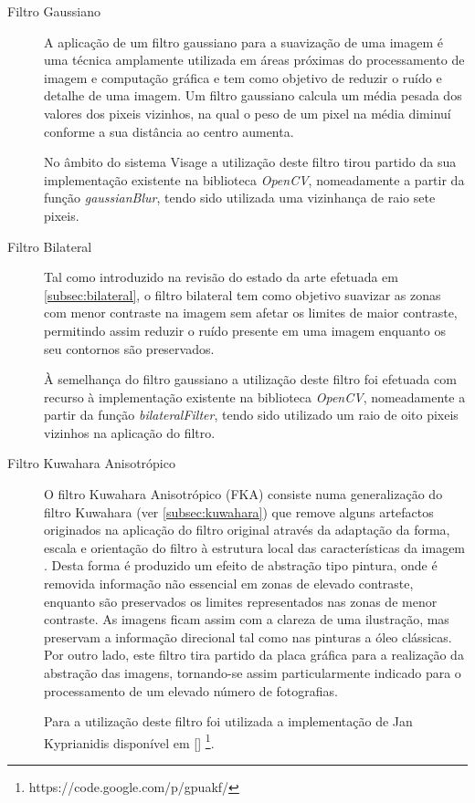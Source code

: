 \begin{description}
\item[Filtro Gaussiano]
A aplicação de um filtro gaussiano para a suavização de uma imagem é uma técnica amplamente utilizada em áreas próximas do processamento de imagem e computação gráfica e tem como objetivo de reduzir o ruído e detalhe de uma imagem. Um filtro gaussiano calcula um média pesada dos valores dos pixeis vizinhos, na qual o peso de um pixel na média diminuí conforme a sua distância ao centro aumenta.

No âmbito do sistema Visage a utilização deste filtro tirou partido da sua implementação existente na biblioteca \textit{OpenCV}, nomeadamente a partir da função \textit{gaussianBlur}, tendo sido utilizada uma vizinhança de raio sete pixeis.

\item[Filtro Bilateral]
Tal como introduzido na revisão do estado da arte efetuada em \ref{subsec:bilateral}, o filtro bilateral tem como objetivo suavizar as zonas com menor contraste na imagem sem afetar os limites de maior contraste, permitindo assim reduzir o ruído presente em uma imagem enquanto os seu contornos são preservados.

À semelhança do filtro gaussiano a utilização deste filtro foi efetuada com recurso à implementação existente na biblioteca \textit{OpenCV}, nomeadamente a partir da função \textit{bilateralFilter}, tendo sido utilizado um raio de oito pixeis vizinhos na aplicação do filtro.

\item[Filtro Kuwahara Anisotrópico]
O filtro Kuwahara Anisotrópico (FKA) consiste numa generalização do filtro Kuwahara (ver \ref{subsec:kuwahara}) que remove alguns artefactos originados na aplicação do filtro original através da adaptação da forma, escala e orientação do filtro à estrutura local das características da imagem \cite{Kyprianidis2009}. Desta forma é produzido um efeito de abstração tipo pintura, onde é removida informação não essencial em zonas de elevado contraste, enquanto são preservados os limites representados nas zonas de menor contraste. As imagens ficam assim com a clareza de uma ilustração, mas preservam a informação direcional tal como nas pinturas a óleo clássicas. Por outro lado, este filtro tira partido da placa gráfica para a realização da abstração das imagens, tornando-se assim particularmente indicado para o processamento de um elevado número de fotografias.

Para a utilização deste filtro foi utilizada a implementação de Jan Kyprianidis disponível em [] \footnote{https://code.google.com/p/gpuakf/}.

\end{description}
